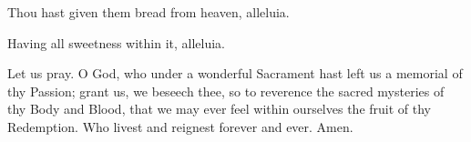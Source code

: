 {\noindent \vv Thou hast given them bread from heaven, alleluia.

\noindent \rr Having all sweetness within it, alleluia.

\noindent Let us pray. O God, who under a wonderful Sacrament hast left us a memorial of thy Passion; grant us, we beseech thee, so to reverence the sacred mysteries of thy Body and Blood, that we may ever feel within ourselves the fruit of thy Redemption. Who livest and reignest forever and ever. Amen.}